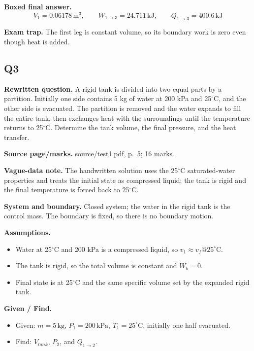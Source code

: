 \textbf{Boxed final answer.}
\[
\boxed{V_1=0.06178\,\text{m}^3,\qquad W_{1\to3}=24.711\,\text{kJ},\qquad Q_{1\to3}=400.6\,\text{kJ}}
\]

\textbf{Exam trap.} The first leg is constant volume, so its boundary work is zero even though heat is added.


\subsection*{Q3}
\textbf{Rewritten question.} A rigid tank is divided into two equal parts by a partition. Initially one side contains 5 kg of water at 200 kPa and 25$^\circ$C, and the other side is evacuated. The partition is removed and the water expands to fill the entire tank, then exchanges heat with the surroundings until the temperature returns to 25$^\circ$C. Determine the tank volume, the final pressure, and the heat transfer.

\textbf{Source page/marks.} source/test1.pdf, p.~5; 16 marks.

\textbf{Vague-data note.} The handwritten solution uses the 25$^\circ$C saturated-water properties and treats the initial state as compressed liquid; the tank is rigid and the final temperature is forced back to 25$^\circ$C.

\textbf{System and boundary.} Closed system; the water in the rigid tank is the control mass. The boundary is fixed, so there is no boundary motion.

\textbf{Assumptions.}
\begin{itemize}
  \item Water at 25$^\circ$C and 200 kPa is a compressed liquid, so $v_1\approx v_f@25^\circ$C.
  \item The tank is rigid, so the total volume is constant and $W_b=0$.
  \item Final state is at 25$^\circ$C and the same specific volume set by the expanded rigid tank.
\end{itemize}

\textbf{Given / Find.}
\begin{itemize}
  \item Given: $m=5\,\text{kg}$, $P_1=200\,\text{kPa}$, $T_1=25^\circ\text{C}$, initially one half evacuated.
  \item Find: $V_{tank}$, $P_2$, and $Q_{1\to2}$.
\end{itemize}

